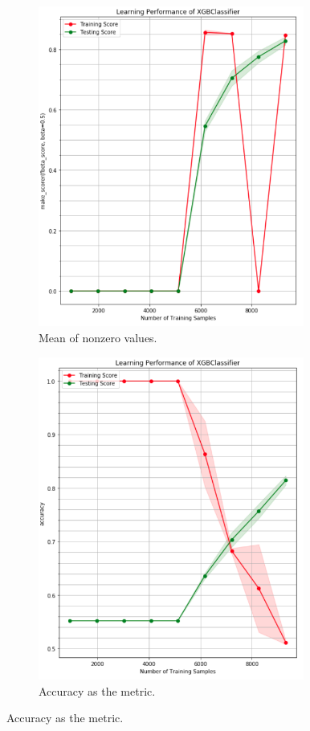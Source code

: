 \documentclass[a4paper]{article}
\begin{document}
\begin{figure}
\begin{subfigure}[b]{0.33\textwidth}
					\includegraphics[width=0.96\textwidth]{xgbLearningCurve2.png}\caption{\label{fig:xgb_lc2}Mean of nonzero values.}
				\end{subfigure}
				\begin{subfigure}[b]{0.33\textwidth}
					\centering
					\includegraphics[width=0.96\textwidth]{LearningCurveAcc.png}\caption{\label{fig:xgb_lc3}Accuracy as the metric.}

\end{subfigure}
\end{figure}
\end{document}
